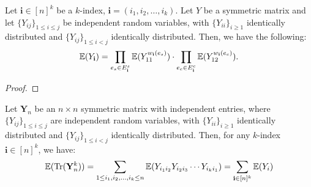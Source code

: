 \begin{lemma}
    \label{lem:prod_expectation_matrix_multi_index}
    \notready
    Let $\mathbf{i} \in[n]^k$ be a $k$-index, $\mathbf{i}=\left(i_1, i_2, \ldots, i_k\right)$. Let $Y$ be a symmetric matrix and let $\{Y_{ij}\}_{1\le i\le j}$ be independent random variables, with $\{Y_{ii}\}_{i\ge 1}$ identically distributed and $\{Y_{ij}\}_{1\le i<j}$ identically distributed. Then, we have the following:
    $$
    \mathbb{E}(Y_{\mathbf{i}}) = \prod_{e_s \in E_{\mathbf{i}}^s} \mathbb{E}(Y_{11}^{w_{\mathbf{i}}(e_s)}) \cdot \prod_{e_c \in E_{\mathbf{i}}^c} \mathbb{E}(Y_{12}^{w_{\mathbf{i}}(e_c)}).
    $$
\end{lemma}

\begin{proof}
\end{proof}

\begin{lemma}
    \label{lem:trace_expectation_of_matrix}
    \notready
    Let $\mathbf{Y}_{n}$ be an $n \times n$ symmetric matrix with independent entries, where $\{Y_{ij}\}_{1\le i\le j}$ are independent random variables, with $\{Y_{ii}\}_{i\ge 1}$ identically distributed and $\{Y_{ij}\}_{1\le i<j}$ identically distributed. Then, for any $k$-index $\mathbf{i} \in [n]^k$, we have:
    $$
    \mathbb{E}(\operatorname{Tr}(\mathbf{Y}_{n}^{k})) = \sum_{1 \leq i_1, i_2, \ldots, i_k \leq n} \mathbb{E}(Y_{i_1 i_2} Y_{i_2 i_3} \cdots Y_{i_k i_1}) = \sum_{\mathbf{i} \in [n]^{k}} \mathbb{E}(Y_{i})
    $$
\end{lemma}

